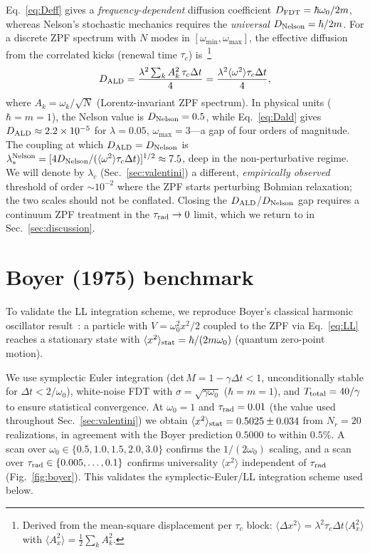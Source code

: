 \documentclass[aps,prl,twocolumn,superscriptaddress]{revtex4-2}
\newcommand{\taur}{\tau_{\rm rad}}
\newcommand{\Dald}{D_{\rm ALD}}
\newcommand{\Dnel}{D_{\rm Nelson}}
\begin{document}
Eq.~\eqref{eq:Deff} gives a \emph{frequency-dependent} diffusion coefficient
$D_{\rm FDT} = \hbar\omega_0/2m$, whereas Nelson's stochastic mechanics
requires the \emph{universal} $\Dnel = \hbar/2m$.
For a discrete ZPF spectrum with $N$ modes in $[\omega_{\min}, \omega_{\max}]$,
the effective diffusion from the correlated kicks (renewal time $\tau_c$)
is~\footnote{Derived from the mean-square displacement per $\tau_c$ block:
$\langle \Delta x^2 \rangle = \lambda^2 \tau_c \Delta t \langle A_x^2 \rangle$
with $\langle A_x^2 \rangle = \tfrac{1}{2}\sum_k A_k^2$.}
\begin{equation}
  \Dald = \frac{\lambda^2 \sum_k A_k^2 \,\tau_c \Delta t}{4}
         = \frac{\lambda^2 \langle\omega^2\rangle \tau_c \Delta t}{4},
\label{eq:Dald}
\end{equation}
where $A_k = \omega_k / \sqrt{N}$ (Lorentz-invariant ZPF spectrum).
In physical units ($\hbar = m = 1$), the Nelson value is $\Dnel = 0.5$,
while Eq.~\eqref{eq:Dald} gives $\Dald \approx 2.2\times10^{-5}$ for
$\lambda = 0.05$, $\omega_{\max} = 3$---a gap of four orders of magnitude.
The coupling at which $\Dald = \Dnel$ is
$\lambda_*^{\rm Nelson} = [4\Dnel / (\langle\omega^2\rangle \tau_c \Delta t)]^{1/2}
\approx 7.5$, deep in the non-perturbative regime.
We will denote by $\lambda_c$ (Sec.~\ref{sec:valentini}) a different,
\emph{empirically observed} threshold of order $\sim 10^{-2}$ where the
ZPF starts perturbing Bohmian relaxation; the two scales should not be
conflated.
Closing the $\Dald$/$\Dnel$ gap requires a continuum ZPF treatment in the
$\taur \to 0$ limit, which we return to in Sec.~\ref{sec:discussion}.


\section{Boyer (1975) benchmark}
\label{sec:boyer}

To validate the LL integration scheme, we reproduce Boyer's
classical harmonic oscillator result~\cite{Boyer1975}:
a particle with $V = \omega_0^2 x^2/2$ coupled to the ZPF via
Eq.~\eqref{eq:LL} reaches a stationary state with
$\langle x^2 \rangle_{\rm stat} = \hbar/(2m\omega_0)$
(quantum zero-point motion).

We use symplectic Euler integration (det$\,M = 1 - \gamma\Delta t < 1$,
unconditionally stable for $\Delta t < 2/\omega_0$), white-noise FDT
with $\sigma = \sqrt{\gamma \omega_0}$ ($\hbar = m = 1$), and
$T_{\rm total} = 40/\gamma$ to ensure statistical convergence.
At $\omega_0 = 1$ and $\taur = 0.01$ (the value used throughout
Sec.~\ref{sec:valentini}) we obtain
$\langle x^2 \rangle_{\rm stat} = 0.5025 \pm 0.034$ from $N_r = 20$
realizations, in agreement with the Boyer prediction $0.5000$ to
within $0.5\%$.
A scan over $\omega_0 \in \{0.5, 1.0, 1.5, 2.0, 3.0\}$ confirms the
$1/(2\omega_0)$ scaling, and a scan over $\taur \in \{0.005, \ldots, 0.1\}$
confirms universality $\langle x^2 \rangle$ independent of $\taur$
(Fig.~\ref{fig:boyer}).
This validates the symplectic-Euler/LL integration scheme used below.
\end{document}
